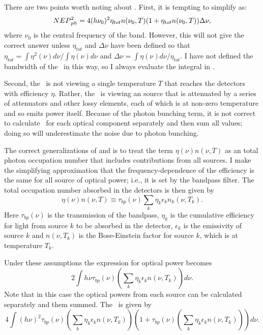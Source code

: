 There are two points worth noting about .
First, it is tempting to simplify  as:
\begin{equation}
  {NEP}^2_{ph} = 4 (h \nu_0)^2 \eta_{tot} n(\nu_0,T) (1 + \eta_{tot} n(\nu_0,T)) \Delta \nu,
\end{equation}
where $\nu_0$ is the central frequency of the band.
However, this will not give the correct answer unless $\eta_{tot}$ and $\Delta \nu$ have been defined so that $\eta_{tot} = \int \eta^2(\nu) d\nu / \int \eta(\nu) d\nu$ and $\Delta \nu = \int \eta(\nu) d \nu / \eta_{tot}$.
I have not defined the bandwidth of the \Imager\ in this way, so I always evaluate the integral in .

Second, the \Imager\ is not viewing a single temperature $T$ that reaches the detectors with efficiency $\eta$.
Rather, the \Imager\ is viewing an  source that is attenuated by a series of attenuators and other lossy elements, each of which is at non-zero temperature and so emits power itself.
Because of the photon bunching term, it is not correct to calculate \NEPph\ for each optical component separately and then sum all values; doing so will underestimate the noise due to photon bunching.

The correct generalizations of  and  is to treat the term $\eta(\nu) n(\nu,T)$ as an total photon occupation number that includes contributions from all sources.
I make the simplifying approximation that the frequency-dependence of the efficiency is the same for all source of optical power; i.e., it is set by the bandpass filter.
The total occupation number absorbed in the detectors is then given by
\begin{equation} \label{eqn:ch4-tot-n0}
  \eta(\nu) n(\nu,T) \equiv \tau_{bp}(\nu) \sum_k \eta_k \epsilon_k n_k(\nu,T_k).
\end{equation}
Here $\tau_{bp}(\nu)$ is the transmission of the bandpass, $\eta_k$ is the cumulative efficiency for light from source $k$ to be absorbed in the detector, $\epsilon_k$ is the emissivity of source $k$ and $n(\nu,T_k)$ is the Bose-Einstein factor  for source $k$, which is at temperature $T_k$.

Under these assumptions the expression for optical power becomes
\begin{equation} \label{eqn:ch4-opt-pow-all}
  2 \int h \nu \tau_{bp}(\nu) \left( \sum_k \eta_k \epsilon_k n(\nu,T_k) \right) d \nu.
\end{equation}
Note that in this case the optical powers from each source can be calculated separately and them summed.
The \NEPph\ is given by
\begin{equation} \label{eqn:ch4-nep-all}
  4 \int (h \nu)^2 \tau_{bp}(\nu) \left( \sum_k \eta_k \epsilon_k n(\nu,T_k) \right) 
       \left( 1 + \tau_{bp}(\nu) \left( \sum_k \eta_k \epsilon_k n(\nu,T_k) \right)  \right) d \nu.
\end{equation}


